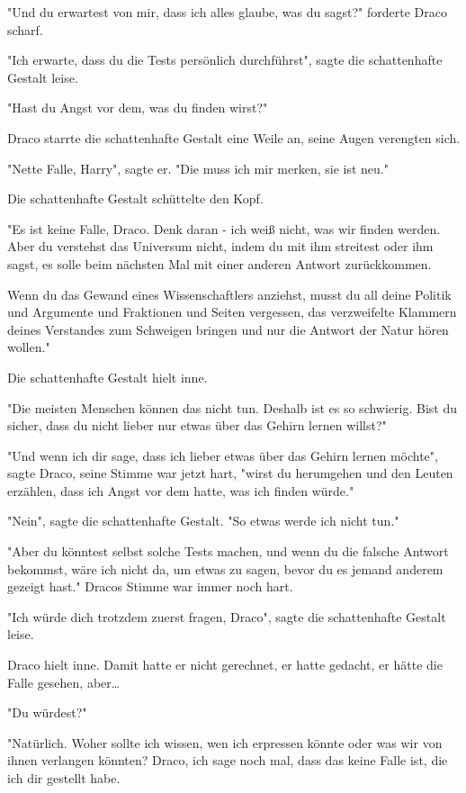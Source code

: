 {"Und du erwartest von mir, dass ich alles glaube, was du sagst?" forderte Draco scharf.

"Ich erwarte, dass du die Tests persönlich durchführst", sagte die schattenhafte Gestalt leise.

"Hast du Angst vor dem, was du finden wirst?"

Draco starrte die schattenhafte Gestalt eine Weile an, seine Augen verengten sich.

"Nette Falle, Harry", sagte er. "Die muss ich mir merken, sie ist neu."

Die schattenhafte Gestalt schüttelte den Kopf.

"Es ist keine Falle, Draco. Denk daran - ich weiß nicht, was wir finden werden. Aber du verstehst das Universum nicht, indem du mit ihm streitest oder ihm sagst, es solle beim nächsten Mal mit einer anderen Antwort zurückkommen.

Wenn du das Gewand eines Wissenschaftlers anziehst, musst du all deine Politik und Argumente und Fraktionen und Seiten vergessen, das verzweifelte Klammern deines Verstandes zum Schweigen bringen und nur die Antwort der Natur hören wollen."

Die schattenhafte Gestalt hielt inne.

"Die meisten Menschen können das nicht tun. Deshalb ist es so schwierig. Bist du sicher, dass du nicht lieber nur etwas über das Gehirn lernen willst?"

"Und wenn ich dir sage, dass ich lieber etwas über das Gehirn lernen möchte", sagte Draco, seine Stimme war jetzt hart, "wirst du herumgehen und den Leuten erzählen, dass ich Angst vor dem hatte, was ich finden würde."

"Nein", sagte die schattenhafte Gestalt. "So etwas werde ich nicht tun."

"Aber du könntest selbst solche Tests machen, und wenn du die falsche Antwort bekommst, wäre ich nicht da, um etwas zu sagen, bevor du es jemand anderem gezeigt hast." Dracos Stimme war immer noch hart.

"Ich würde dich trotzdem zuerst fragen, Draco", sagte die schattenhafte Gestalt leise.

Draco hielt inne. Damit hatte er nicht gerechnet, er hatte gedacht, er hätte die Falle gesehen, aber…

"Du würdest?"

"Natürlich. Woher sollte ich wissen, wen ich erpressen könnte oder was wir von ihnen verlangen könnten? Draco, ich sage noch mal, dass das keine Falle ist, die ich dir gestellt habe.

}
